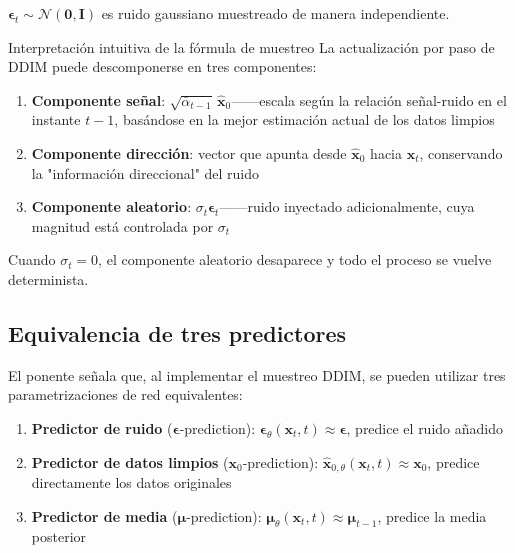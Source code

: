 \documentclass[a4paper]{article}
\begin{document}
$\boldsymbol{\epsilon}_t \sim \mathcal{N}(\mathbf{0}, \mathbf{I})$ es ruido gaussiano muestreado de manera independiente.

\begin{importantbox}{Interpretación intuitiva de la fórmula de muestreo}
La actualización por paso de DDIM puede descomponerse en tres componentes:
\begin{enumerate}
    \item \textbf{Componente señal}: $\sqrt{\bar{\alpha}_{t-1}}\,\hat{\mathbf{x}}_0$——escala según la relación señal-ruido en el instante $t-1$, basándose en la mejor estimación actual de los datos limpios
    \item \textbf{Componente dirección}: vector que apunta desde $\hat{\mathbf{x}}_0$ hacia $\mathbf{x}_t$, conservando la "información direccional" del ruido
    \item \textbf{Componente aleatorio}: $\sigma_t \boldsymbol{\epsilon}_t$——ruido inyectado adicionalmente, cuya magnitud está controlada por $\sigma_t$
\end{enumerate}
Cuando $\sigma_t=0$, el componente aleatorio desaparece y todo el proceso se vuelve determinista.
\end{importantbox}

\subsection{Equivalencia de tres predictores}

El ponente señala que, al implementar el muestreo DDIM, se pueden utilizar tres parametrizaciones de red equivalentes:

\begin{enumerate}
    \item \textbf{Predictor de ruido} ($\boldsymbol{\epsilon}$-prediction): $\boldsymbol{\epsilon}_\theta(\mathbf{x}_t, t) \approx \boldsymbol{\epsilon}$, predice el ruido añadido
    \item \textbf{Predictor de datos limpios} ($\mathbf{x}_0$-prediction): $\hat{\mathbf{x}}_{0,\theta}(\mathbf{x}_t, t) \approx \mathbf{x}_0$, predice directamente los datos originales
    \item \textbf{Predictor de media} ($\boldsymbol{\mu}$-prediction): $\boldsymbol{\mu}_\theta(\mathbf{x}_t, t) \approx \boldsymbol{\mu}_{t-1}$, predice la media posterior
\end{enumerate}
\end{document}
